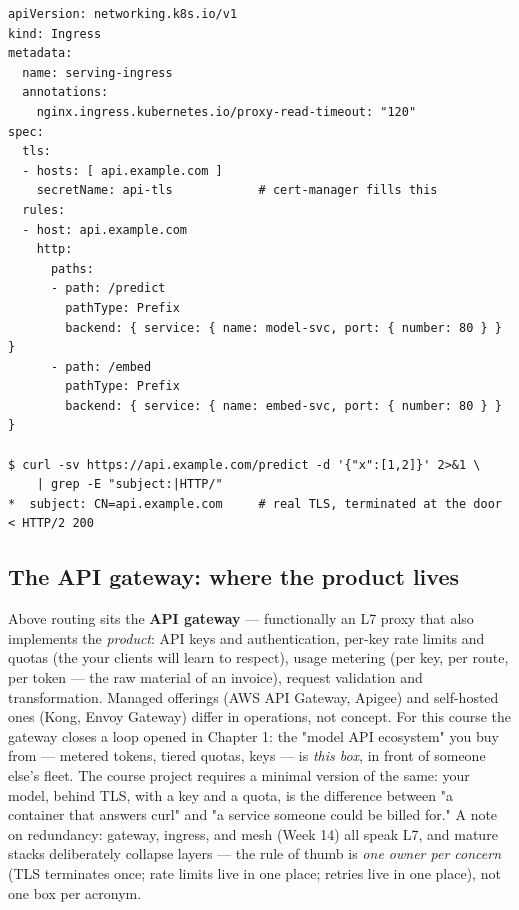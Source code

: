 \begin{terminalbox}
\begin{Verbatim}[breaklines=true,breakanywhere=true,fontsize=\small,formatcom=\color{tbbtermfg},codes=\tbbcodeactive]
apiVersion: networking.k8s.io/v1
kind: Ingress
metadata:
  name: serving-ingress
  annotations:
    nginx.ingress.kubernetes.io/proxy-read-timeout: "120"
spec:
  tls:
  - hosts: [ api.example.com ]
    secretName: api-tls            # cert-manager fills this
  rules:
  - host: api.example.com
    http:
      paths:
      - path: /predict
        pathType: Prefix
        backend: { service: { name: model-svc, port: { number: 80 } } }
      - path: /embed
        pathType: Prefix
        backend: { service: { name: embed-svc, port: { number: 80 } } }

$ curl -sv https://api.example.com/predict -d '{"x":[1,2]}' 2>&1 \
    | grep -E "subject:|HTTP/"
*  subject: CN=api.example.com     # real TLS, terminated at the door
< HTTP/2 200
\end{Verbatim}
\end{terminalbox}

\subsection*{The API gateway: where the product lives}

Above routing sits the \textbf{API gateway} — functionally an L7 proxy that also implements the \textit{product}: API keys and authentication, per-key rate limits and quotas (the  your clients will learn to respect), usage metering (per key, per route, per token — the raw material of an invoice), request validation and transformation. Managed offerings (AWS API Gateway, Apigee) and self-hosted ones (Kong, Envoy Gateway) differ in operations, not concept. For this course the gateway closes a loop opened in Chapter 1: the "model API ecosystem" you buy from — metered tokens, tiered quotas, keys — is \textit{this box}, in front of someone else's fleet. The course project requires a minimal version of the same: your model, behind TLS, with a key and a quota, is the difference between "a container that answers curl" and "a service someone could be billed for." A note on redundancy: gateway, ingress, and mesh (Week 14) all speak L7, and mature stacks deliberately collapse layers — the rule of thumb is \textit{one owner per concern} (TLS terminates once; rate limits live in one place; retries live in one place), not one box per acronym.

